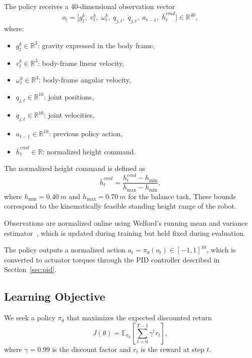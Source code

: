 \documentclass[conference]{IEEEtran}
\begin{document}
The policy receives a 40-dimensional observation vector
\begin{equation}
o_t = \big[g_t^b,\; v_t^b,\; \omega_t^b,\; q_{j,t},\; \dot{q}_{j,t},\; a_{t-1},\; \bar{h}_t^{cmd}\big] \in \mathbb{R}^{40},
\end{equation}
where:
\begin{itemize}
    \item $g_t^b \in \mathbb{R}^3$: gravity expressed in the body frame,
    \item $v_t^b \in \mathbb{R}^3$: body-frame linear velocity,
    \item $\omega_t^b \in \mathbb{R}^3$: body-frame angular velocity,
    \item $q_{j,t} \in \mathbb{R}^{10}$: joint positions,
    \item $\dot{q}_{j,t} \in \mathbb{R}^{10}$: joint velocities,
    \item $a_{t-1} \in \mathbb{R}^{10}$: previous policy action,
    \item $\bar{h}_t^{cmd} \in \mathbb{R}$: normalized height command.
\end{itemize}

The normalized height command is defined as
\begin{equation}
\bar{h}_t^{cmd} = \frac{h_t^{cmd} - h_{\min}}{h_{\max} - h_{\min}},
\label{eq:height_norm}
\end{equation}
where $h_{\min} = \SI{0.40}{m}$ and $h_{\max} = \SI{0.70}{m}$ for the balance task. These bounds correspond to the kinematically feasible standing height range of the robot.

Observations are normalized online using Welford's running mean and variance estimator~\cite{welford1962}, which is updated during training but held fixed during evaluation.

The policy outputs a normalized action $a_t = \pi_\theta(o_t) \in [-1,1]^{10}$, which is converted to actuator torques through the PID controller described in Section~\ref{sec:pid}.

\subsection{Learning Objective}
We seek a policy $\pi_\theta$ that maximizes the expected discounted return
\begin{equation}
J(\theta)=\mathbb{E}_{\pi_\theta}\left[\sum_{t=0}^{T-1}\gamma^t r_t\right],
\end{equation}
where $\gamma = 0.99$ is the discount factor and $r_t$ is the reward at step $t$.
\end{document}
